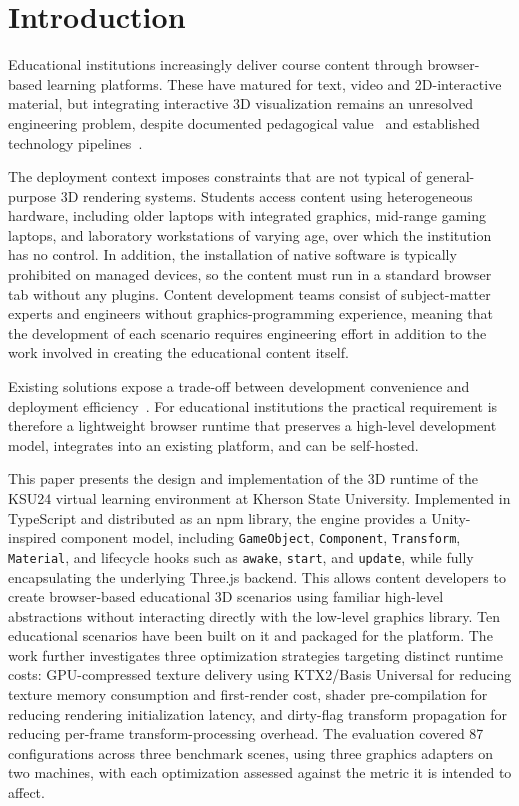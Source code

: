 \section{Introduction}

Educational institutions increasingly deliver course content through browser-based learning platforms. These have matured for text, video and 2D-interactive material, but integrating interactive 3D visualization remains an unresolved engineering problem, despite documented pedagogical value~\cite{Li2021,Yang2024} and established technology pipelines~\cite{Rodrguez2021,Hensen2023}.

The deployment context imposes constraints that are not typical of general-purpose 3D rendering systems. Students access content using heterogeneous hardware, including older laptops with integrated graphics, mid-range gaming laptops, and laboratory workstations of varying age, over which the institution has no control. In addition, the installation of native software is typically prohibited on managed devices, so the content must run in a standard browser tab without any plugins. Content development teams consist of subject-matter experts and engineers without graphics-programming experience, meaning that the development of each scenario requires engineering effort in addition to the work involved in creating the educational content itself.

Existing solutions expose a trade-off between development convenience and deployment efficiency~\cite{Evans2014}. For educational institutions the practical requirement is therefore a lightweight browser runtime that preserves a high-level development model, integrates into an existing platform, and can be self-hosted.

This paper presents the design and implementation of the 3D runtime of the KSU24 virtual learning environment at Kherson State University. Implemented in TypeScript and distributed as an npm library, the engine provides a Unity-inspired component model, including \texttt{GameObject}, \texttt{Component}, \texttt{Transform}, \texttt{Material}, and lifecycle hooks such as \texttt{awake}, \texttt{start}, and \texttt{update}, while fully encapsulating the underlying Three.js backend. This allows content developers to create browser-based educational 3D scenarios using familiar high-level abstractions without interacting directly with the low-level graphics library. Ten educational scenarios have been built on it and packaged for the platform. The work further investigates three optimization strategies targeting distinct runtime costs: GPU-compressed texture delivery using KTX2/Basis Universal for reducing texture memory consumption and first-render cost, shader pre-compilation for reducing rendering initialization latency, and dirty-flag transform propagation for reducing per-frame transform-processing overhead. The evaluation covered 87 configurations across three benchmark scenes, using three graphics adapters on two machines, with each optimization assessed against the metric it is intended to affect.